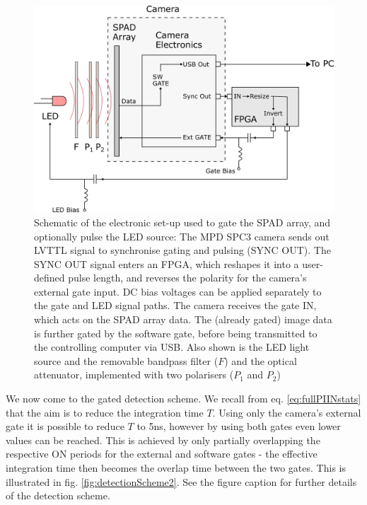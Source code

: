 \documentclass[]{article}
\begin{document}
		\begin{figure}[h!]
			\centering
			\includegraphics[width=0.8\linewidth]{Figures/electronics_schematic}
			\caption{Schematic of the electronic set-up used to gate the SPAD array, and optionally pulse the LED source: The MPD SPC3 camera sends out LVTTL signal to synchronise gating and pulsing (SYNC OUT). The SYNC OUT signal enters an FPGA, which reshapes it into a user-defined pulse length, and reverses the polarity for the camera's external gate input. DC bias voltages can be applied separately to the gate and LED signal paths. The camera receives the gate IN, which acts on the SPAD array data. The (already gated) image data is further gated by the software gate, before being transmitted to the controlling computer via USB. Also shown is the LED light source and the removable bandpass filter ($F$) and the optical attenuator, implemented with two polarisers ($P_1$ and $P_2$)}
			\label{fig:electronics_schematic}
		\end{figure}
		
	We now come to the gated detection scheme. We recall from eq. \ref{eq:fullPIINstats} that the aim is to reduce the integration time $T$. Using only the camera's external gate it is possible to reduce $T$ to 5ns, however by using both gates even lower values can be reached. This is achieved by only partially overlapping the respective ON periods for the external and software gates - the effective integration time then becomes the overlap time between the two gates. This is illustrated in fig. \ref{fig:detectionScheme2}. See the figure caption for further details of the detection scheme.
	
\end{document}
